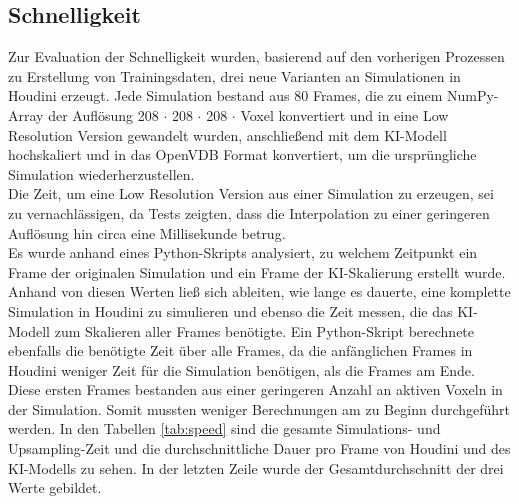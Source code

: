 \subsection{Schnelligkeit}
Zur Evaluation der Schnelligkeit wurden, basierend auf den vorherigen Prozessen zu Erstellung von Trainingsdaten, drei neue Varianten an Simulationen in Houdini erzeugt. Jede Simulation bestand aus 80 Frames, die zu einem NumPy-Array der Auflösung 208 $\cdot$ 208 $\cdot$ 208 $\cdot$ Voxel konvertiert und in eine Low Resolution Version gewandelt wurden, anschließend mit dem KI-Modell hochskaliert und in das OpenVDB Format konvertiert, um die ursprüngliche Simulation wiederherzustellen.\\

Die Zeit, um eine Low Resolution Version aus einer Simulation zu erzeugen, sei zu vernachlässigen, da Tests zeigten, dass die Interpolation zu einer geringeren Auflösung hin circa eine Millisekunde betrug.\\

Es wurde anhand eines Python-Skripts analysiert, zu welchem Zeitpunkt ein Frame der originalen Simulation und ein Frame der KI-Skalierung erstellt wurde. Anhand von diesen Werten ließ sich ableiten, wie lange es dauerte, eine komplette Simulation in Houdini zu simulieren und ebenso die Zeit messen, die das KI-Modell zum Skalieren aller Frames benötigte. Ein Python-Skript berechnete ebenfalls die benötigte Zeit über alle Frames, da die anfänglichen Frames in Houdini weniger Zeit für die Simulation benötigen, als die Frames am Ende. Diese ersten Frames bestanden aus einer geringeren Anzahl an aktiven Voxeln in der Simulation. Somit mussten weniger Berechnungen am zu Beginn durchgeführt werden. In den Tabellen \ref{tab:speed} sind die gesamte Simulations- und Upsampling-Zeit und die durchschnittliche Dauer pro Frame von Houdini und des KI-Modells zu sehen. In der letzten Zeile wurde der Gesamtdurchschnitt der drei Werte gebildet. \\

